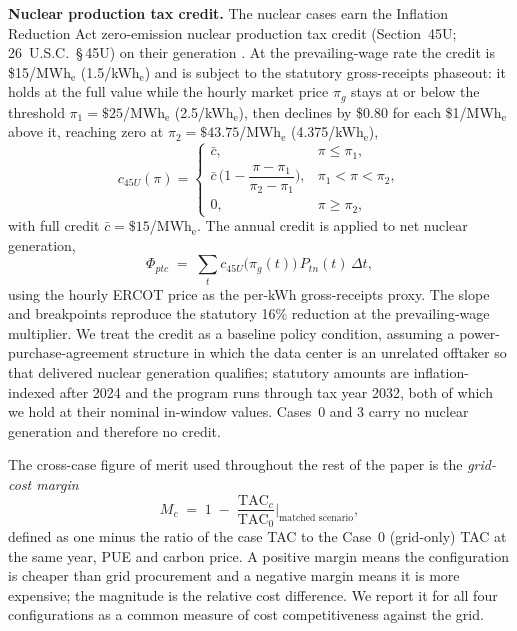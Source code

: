 \documentclass[a4paper,fleqn]{cas-sc}
\newcommand{\runinhead}[1]{\par\smallskip\noindent\textbf{#1.}\quad}
\begin{document}
\runinhead{Nuclear production tax credit}
The nuclear cases earn the Inflation Reduction Act zero-emission nuclear production tax credit (Section~45U; 26~U.S.C.~\S\,45U) on their generation \citep{usc26_45u,irs45u}. At the prevailing-wage rate the credit is \$15/MWh$_\mathrm{e}$ (1.5\textcent/kWh$_\mathrm{e}$) and is subject to the statutory gross-receipts phaseout: it holds at the full value while the hourly market price $\pi_g$ stays at or below the threshold $\pi_1=\$25$/MWh$_\mathrm{e}$ (2.5\textcent/kWh$_\mathrm{e}$), then declines by \$0.80 for each \$1/MWh$_\mathrm{e}$ above it, reaching zero at $\pi_2=\$43.75$/MWh$_\mathrm{e}$ (4.375\textcent/kWh$_\mathrm{e}$),
\begin{equation}
\label{eq:ptc}
c_{45U}(\pi)=
\begin{cases}
\bar{c}, & \pi \le \pi_1,\\[2pt]
\bar{c}\,\Big(1-\dfrac{\pi-\pi_1}{\pi_2-\pi_1}\Big), & \pi_1 < \pi < \pi_2,\\[6pt]
0, & \pi \ge \pi_2,
\end{cases}
\end{equation}
with full credit $\bar{c}=\$15$/MWh$_\mathrm{e}$. The annual credit is applied to net nuclear generation,
\begin{equation}
\label{eq:ptc_total}
\Phi_{ptc} \;=\; \sum_t c_{45U}\!\big(\pi_g(t)\big)\,P_{tn}(t)\,\Delta t,
\end{equation}
using the hourly ERCOT price as the per-kWh gross-receipts proxy. The slope and breakpoints reproduce the statutory 16\% reduction at the prevailing-wage multiplier. We treat the credit as a baseline policy condition, assuming a power-purchase-agreement structure in which the data center is an unrelated offtaker so that delivered nuclear generation qualifies; statutory amounts are inflation-indexed after 2024 and the program runs through tax year 2032, both of which we hold at their nominal in-window values. Cases~0 and 3 carry no nuclear generation and therefore no credit.

The cross-case figure of merit used throughout the rest of the paper is the \emph{grid-cost margin}
\begin{equation}
\label{eq:margin}
M_c \;=\; 1 \;-\; \frac{\mathrm{TAC}_c}{\mathrm{TAC}_0}\Big|_{\text{matched scenario}},
\end{equation}
defined as one minus the ratio of the case TAC to the Case~0 (grid-only) TAC at the same year, PUE and carbon price. A positive margin means the configuration is cheaper than grid procurement and a negative margin means it is more expensive; the magnitude is the relative cost difference. We report it for all four configurations as a common measure of cost competitiveness against the grid.
\end{document}

